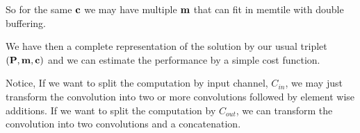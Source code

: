 \documentclass[conference]{IEEEtran}
\begin{document}
So for the same ${\bf c}$ we may have
multiple ${\bf m}$ that can fit in memtile with double buffering.

We have then a complete representation of the solution by our usual
triplet $({\bf P, m ,c})$ and we can estimate the performance by a
simple cost function. 

Notice, If we want to split the computation by input channel,
$C_{in}$, we may just transform the convolution into two or more
convolutions followed by element wise additions. If we want to split
the computation by $C_{out}$, we can transform the convolution into
two convolutions and a concatenation.

























 

%
\end{document}
